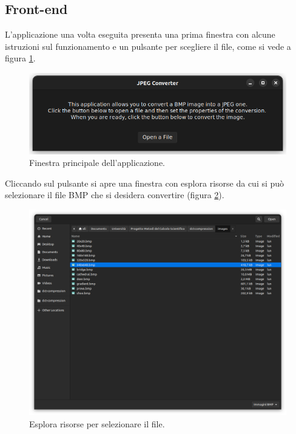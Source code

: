 \documentclass[12pt]{article}
\begin{document}
\subsection{Front-end}

L'applicazione una volta eseguita presenta una prima finestra con alcune istruzioni sul funzionamento e un pulsante per scegliere il file, come si vede a figura \ref{fig:main}. 

\begin{figure}[!ht]
    \begin{center}
    \includegraphics[scale=0.5]{images/main.png}
    \caption{Finestra principale dell'applicazione.}
    \label{fig:main}
    \end{center}
\end{figure}

Cliccando sul pulsante si apre una finestra con esplora risorse da cui si può selezionare il file BMP che si desidera convertire (figura \ref{fig:fc}). 

\begin{figure}[!ht]
    \begin{center}
    \includegraphics[width=\textwidth]{images/filechooser.png}
    \caption{Esplora risorse per selezionare il file.}
    \label{fig:fc}
    \end{center}
\end{figure}
\end{document}
